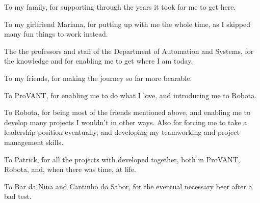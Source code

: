 \begin{agradecimentos}

To my family, for supporting through the years it took for me to get here.

To my girlfriend Mariana, for putting up with me the whole time, as I skipped many fun things to work instead.

The the professors and staff of the Department of Automation and Systems, for the knowledge and for enabling me to get where I am today.

To my friends, for making the journey so far more bearable.

To ProVANT, for enabling me to do what I love, and introducing me to Robota. 

To Robota, for being most of the friends mentioned above, and enabling me to develop many projects I wouldn't in other ways. Also for forcing me to take a leadership position eventually, and developing my teamworking and project management skills.

To Patrick, for all the projects with developed together, both in ProVANT, Robota, and, when there was time, at life.

To Bar da Nina and Cantinho do Sabor, for the eventual necessary beer after a bad test.



\end{agradecimentos}

